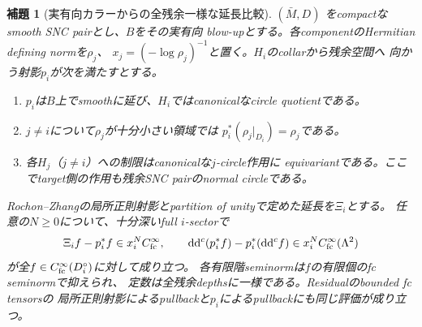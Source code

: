 \documentclass[11pt,a4paper]{ltjsarticle}
\newcommand{\dd}{\mathrm d}
\theoremstyle{plain}
\newtheorem{lemma}[lemma]{補題}
\theoremstyle{definition}
\theoremstyle{remark}
\begin{document}
\begin{lemma}[実有向カラーからの全残余一様な延長比較]
\label{lem:fc-collar-transfer}
$(\bar M,D)$ をcompactなsmooth SNC pairとし、$B$をその実有向
blow-upとする。各componentのHermitian defining normを$\rho_j$、
$x_j=(-\log\rho_j)^{-1}$と置く。$H_i$のcollarから残余空間へ
向かう射影$p_i$が次を満たすとする。
\begin{enumerate}
\item $p_i$は$B$上でsmoothに延び、$H_i$ではcanonicalなcircle quotientである。
\item $j\ne i$について$\rho_j$が十分小さい領域では
$p_i^*(\rho_j|_{D_i})=\rho_j$である。
\item 各$H_j$（$j\ne i$）への制限はcanonicalな$j$-circle作用に
equivariantである。ここでtarget側の作用も残余SNC pairのnormal circleである。
\end{enumerate}
Rochon--Zhangの局所正則射影とpartition of unityで定めた延長を$\Xi_i$とする。
任意の$N\ge0$について、十分深いfull $i$-sectorで
\[
 \Xi_i f-p_i^*f\in x_i^N C^\infty_{\rm fc},\qquad
 \dd\dd^c(p_i^*f)-p_i^*(\dd\dd^cf)\in
 x_i^N C^\infty_{\rm fc}(\Lambda^2)
\]
が全$f\in C^\infty_{\rm fc}(D_i^\circ)$に対して成り立つ。
各有限階seminormは$f$の有限個のfc seminormで抑えられ、
定数は全残余depthsに一様である。Residualのbounded fc tensorsの
局所正則射影によるpullbackと$p_i$によるpullbackにも同じ評価が成り立つ。
\end{lemma}
\end{document}
